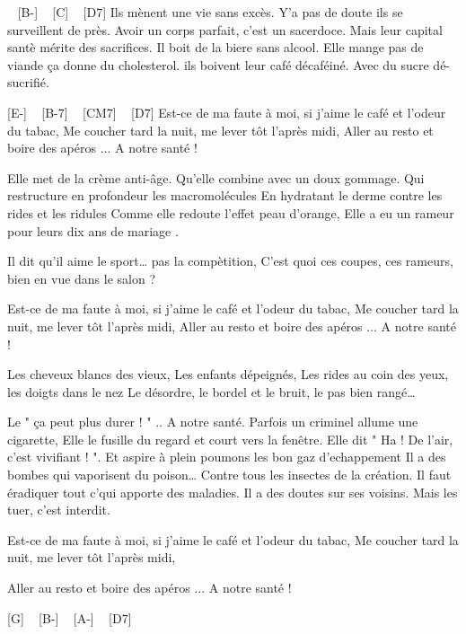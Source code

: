 \begin{guitar}
[G] ~ [B-] ~ [C] ~ [D7]
Ils mènent une vie sans excès.
Y'a pas de doute ils se surveillent de près.
Avoir un corps parfait, c'est un sacerdoce.
Mais leur capital santè mérite des sacrifices.
Il boit de la biere sans alcool.
Elle mange pas de viande ça donne du cholesterol.
ils boivent leur café décaféiné.
Avec du sucre dé-sucrifié.

[E-] ~ [B-7] ~ [CM7] ~ [D7]
Est-ce de ma faute à moi, si j'aime le café et l'odeur du tabac,
Me coucher tard la nuit, me lever tôt l'après midi,
Aller au resto et boire des apéros
... A notre santé !

Elle met de la crème anti-âge.
Qu'elle combine avec un doux gommage.
Qui restructure en profondeur les macromolécules
En hydratant le derme contre les rides et les ridules
Comme elle redoute l'effet peau d'orange,
Elle a eu un rameur pour leurs dix ans de mariage .

Il dit qu'il aime le sport… pas la compètition,
C'est quoi ces coupes, ces rameurs, bien en vue dans le salon ?

Est-ce de ma faute à moi, si j'aime le café et l'odeur du tabac,
Me coucher tard la nuit, me lever tôt l'après midi,
Aller au resto et boire des apéros
... A notre santé !

Les cheveux blancs des vieux, Les enfants dépeignés,
Les rides au coin des yeux, les doigts dans le nez
Le désordre, le bordel et le bruit, le pas bien rangé…

Le " ça peut plus durer ! "
.. A notre santé.
Parfois un criminel allume une cigarette,
Elle le fusille du regard et court vers la fenêtre.
Elle dit " Ha ! De l'air, c'est vivifiant ! ".
Et aspire à plein poumons les bon gaz d'echappement
Il a des bombes qui vaporisent du poison…
Contre tous les insectes de la création.
Il faut éradiquer tout c'qui apporte des maladies.
Il a des doutes sur ses voisins. Mais les tuer, c'est interdit.

Est-ce de ma faute à moi, si j'aime le café et l'odeur du tabac,
Me coucher tard la nuit, me lever tôt l'après midi,

Aller au resto et boire des apéros
... A notre santé ! 

[G] ~ [B-] ~ [A-] ~ [D7]
\end{guitar}